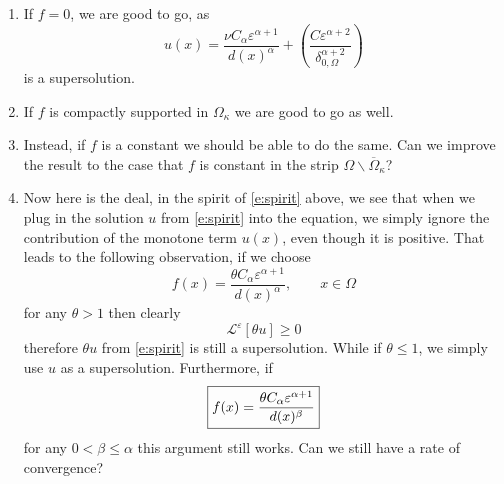 \documentclass[10pt]{article}
\theoremstyle{plain}
\theoremstyle{remark}
\begin{document}
\begin{enumerate}
    \item If $f = 0$, we are good to go, as 
    \begin{equation}\label{e:spirit}
        u(x) = \frac{\nu C_\alpha\varepsilon^{\alpha+1}}{d(x)^\alpha} + \left(\frac{C\varepsilon^{\alpha+2}}{\delta_{0,\Omega}^{\alpha+2}}\right)
    \end{equation}
    is a supersolution. 
    \item If $f$ is compactly supported in $\Omega_\kappa$ we are good to go as well.
    \item Instead, if $f$ is a constant we should be able to do the same. Can we improve the result to the case that $f$ is constant in the strip $\Omega\backslash \overline{\Omega}_\kappa$?
    \item Now here is the deal, in the spirit of \eqref{e:spirit} above, we see that when we plug in the solution $u$ from \eqref{e:spirit} into the equation, we simply ignore the contribution of the monotone term $u(x)$, even though it is positive. That leads to the following observation, if we choose 
    \begin{equation*}
        f(x) =  \frac{\theta C_\alpha\varepsilon^{\alpha+1}}{d(x)^\alpha}, \qquad x\in \Omega
    \end{equation*}
    for any $\theta > 1$ then clearly
    \begin{equation*}
        \mathcal{L}^\varepsilon[\theta u] \geq 0
    \end{equation*}
    therefore $\theta u$ from \eqref{e:spirit} is still a supersolution. While if $\theta\leq 1$, we simply use $u$ as a supersolution. Furthermore, if 
    \begin{equation*}
    \fbox{$\displaystyle    f(x) = \frac{\theta C_\alpha\varepsilon^{\alpha+1}}{d(x)^\beta} $}
    \end{equation*}
    for any $0<\beta\leq \alpha$ this argument still works. Can we still have a rate of convergence?
\end{enumerate}





{}
%

\end{document}
